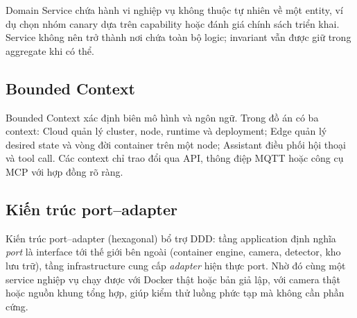 Domain Service chứa hành vi nghiệp vụ không thuộc tự nhiên về một entity, ví dụ
chọn nhóm canary dựa trên capability hoặc đánh giá chính sách triển khai. Service
không nên trở thành nơi chứa toàn bộ logic; invariant vẫn được giữ trong aggregate
khi có thể.

\subsection{Bounded Context}

Bounded Context xác định biên mô hình và ngôn ngữ. Trong đồ án có ba context:
Cloud quản lý cluster, node, runtime và deployment; Edge quản lý desired state và
vòng đời container trên một node; Assistant điều phối hội thoại và tool call. Các
context chỉ trao đổi qua API, thông điệp MQTT hoặc công cụ MCP với hợp đồng rõ ràng.

\subsection{Kiến trúc port--adapter}

Kiến trúc port--adapter (hexagonal) bổ trợ DDD: tầng application định nghĩa
\emph{port} là interface tới thế giới bên ngoài (container engine, camera,
detector, kho lưu trữ), tầng infrastructure cung cấp \emph{adapter} hiện thực
port. Nhờ đó cùng một service nghiệp vụ chạy được với Docker thật hoặc bản giả
lập, với camera thật hoặc nguồn khung tổng hợp, giúp kiểm thử luồng phức tạp mà
không cần phần cứng.